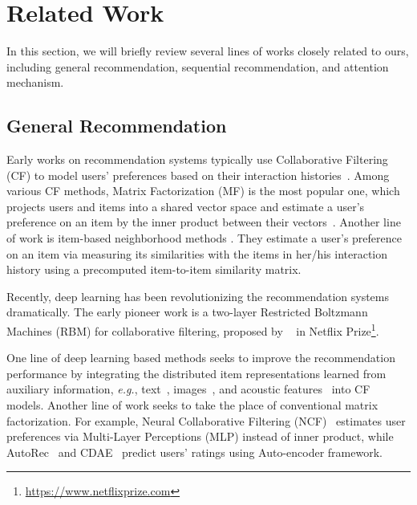 \section{Related Work}

In this section, we will briefly review several lines of works closely related to ours, including general recommendation, sequential recommendation, and attention mechanism.


\subsection{General Recommendation}

Early works on recommendation systems typically use Collaborative  Filtering (CF) to model users' preferences based on their  interaction histories~\cite{Sarwar:www2001:ICF,Koren:ACF:2011}.
Among various CF methods, Matrix Factorization (MF) is the most popular one, which projects users and items into a shared vector space and estimate a user's preference on an item by the inner product between their vectors~\cite{Salakhutdinov:nips2007:PMF,Koren:2009:MFT,Koren:ACF:2011}.
Another line of work is item-based neighborhood methods \cite{Sarwar:www2001:ICF,Linden:ieee2003:ARI,Koren:kdd2008:FMN,Kabbur:kdd2013:FFI}.
They estimate a user's preference on an item via measuring its similarities with the items in her/his interaction history using a precomputed item-to-item similarity matrix.




Recently, deep learning has been revolutionizing the recommendation systems dramatically.
The early pioneer work is a two-layer Restricted Boltzmann Machines (RBM) for collaborative filtering, proposed by \citeauthor{Salakhutdinov:icml2007:RBM}~\cite{Salakhutdinov:icml2007:RBM} in Netflix Prize\footnote{\url{https://www.netflixprize.com}}. %


 One line of deep learning based methods seeks to improve the recommendation performance by integrating the distributed item representations learned from auxiliary information, \textit{e.g.}, text~\cite{Wang:kdd2015:CDL,Kim:recsys2016:CMF}, images~\cite{Wang:www2017:YIR,Kang:icdm2017:Visually}, and acoustic features~\cite{Oord:nips2013:Deep} into CF models. 
Another line of work seeks to take the place of conventional matrix factorization. 
For example, Neural Collaborative Filtering (NCF)~\cite{He:www2017:NCF} estimates user preferences via Multi-Layer Perceptions (MLP) instead of inner product, while AutoRec~\cite{Sedhain:www2015:AAM} and CDAE~\cite{Wu:wsdm2016:CDA} predict users' ratings using Auto-encoder framework.


